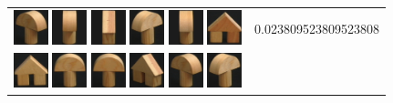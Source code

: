 \begin{figure}[bp]
\begin{tabular}{m{11cm} | m{3cm} |}
\includegraphics[width=1cm]{coil/beeld-4.eps}
\includegraphics[width=1cm]{coil/beeld-5.eps}
\includegraphics[width=1cm]{coil/beeld-47.eps}
\includegraphics[width=1cm]{coil/beeld-3.eps}
\includegraphics[width=1cm]{coil/beeld-2.eps}
\includegraphics[width=1cm]{coil/beeld-43.eps}
& {\scriptsize 0.023809523809523808}
\\
\includegraphics[width=1cm]{coil/beeld-42.eps}
\includegraphics[width=1cm]{coil/beeld-0.eps}
\includegraphics[width=1cm]{coil/beeld-1.eps}
\includegraphics[width=1cm]{coil/beeld-46.eps}
\includegraphics[width=1cm]{coil/beeld-4.eps}
\includegraphics[width=1cm]{coil/beeld-3.eps}

\end{tabular}
\end{figure}
